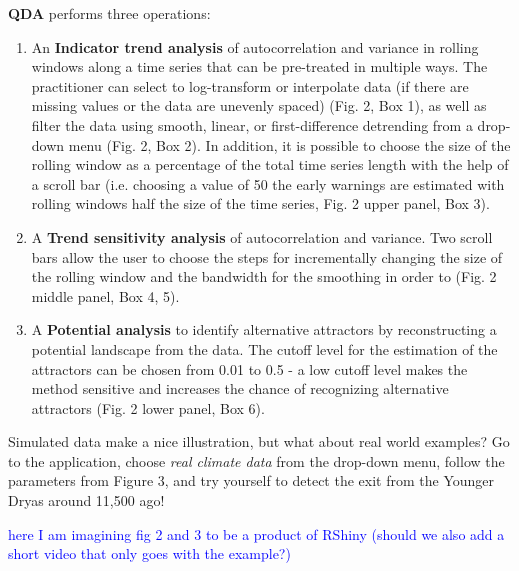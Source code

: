 \documentclass[12pt,a4paper,final]{article}
\begin{document}
\textbf{QDA} performs three operations:
\begin{enumerate}
\item An \textbf{Indicator trend analysis} of autocorrelation and variance in rolling windows along a time series that can be pre-treated in multiple ways. The practitioner can select to log-transform or interpolate data (if there are missing values or the data are unevenly spaced) (Fig. 2, Box 1), as well as filter the data using smooth, linear, or first-difference detrending from a drop-down menu (Fig. 2, Box 2). In addition, it is possible to choose the size of the rolling window as a percentage of the total time series length with the help of a scroll bar (i.e. choosing a value of 50 the early warnings are estimated with rolling windows half the size of the time series, Fig. 2 upper panel, Box 3).
\item A  \textbf{Trend sensitivity analysis} of autocorrelation and variance. Two scroll bars allow the user to choose the steps for incrementally changing the size of the rolling window and the bandwidth for the smoothing in order to (Fig. 2 middle panel, Box 4, 5). 
\item A \textbf{Potential analysis} to identify alternative attractors by reconstructing a potential landscape from the data. The cutoff level for the estimation of the attractors can be chosen from 0.01 to 0.5 - a low cutoff level makes the method sensitive and increases the chance of recognizing alternative attractors (Fig. 2 lower panel, Box 6).
\end{enumerate}

Simulated data make a nice illustration, but what about real world examples? Go to the application, choose \textit{real climate data} from the drop-down menu, follow the parameters from Figure 3, and try yourself to detect the exit from the Younger Dryas around 11,500 ago!

\textcolor{blue}{here I am imagining fig 2 and 3 to be a product of RShiny (should we also add a short video that only goes with the example?)}
\end{document}
